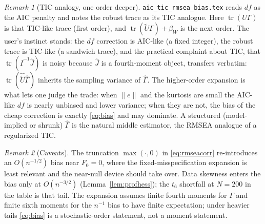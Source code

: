 \documentclass[11pt]{article}
\newcommand{\tr}{\operatorname{tr}}
\theoremstyle{plain}
\theoremstyle{remark}
\newtheorem*{remark}{Remark}
\begin{document}
\begin{remark}[TIC analogy, one order deeper]
\texttt{aic\_tic\_rmsea\_bias.tex} reads $df$ as the AIC penalty and notes the
robust trace as its TIC analogue. Here $\tr(U\Gamma)$ is that TIC-like trace
(first order), and $\tr(\tilde U\Gamma)+\beta_W$ is the next order. The user's
instinct stands: the $df$ correction is AIC-like (a fixed integer), the robust
trace is TIC-like (a sandwich trace), and the practical complaint about TIC, that
$\tr(\hat I^{-1}\hat J)$ is noisy because $\hat J$ is a fourth-moment object,
transfers verbatim: $\tr(\hat{\tilde U}\hat\Gamma)$ inherits the sampling
variance of $\hat\Gamma$. The higher-order expansion is what lets one judge the
trade: when $\|e\|$ and the kurtosis are small the AIC-like $df$ is nearly
unbiased and lower variance; when they are not, the bias of the cheap correction
is exactly \eqref{eq:bias} and may dominate. A structured (model-implied or
shrunk) $\hat\Gamma$ is the natural middle estimator, the RMSEA analogue of a
regularized TIC.
\end{remark}

\begin{remark}[Caveats]
The truncation $\max(\cdot,0)$ in \eqref{eq:rmseacorr} re-introduces an
$O(n^{-1/2})$ bias near $F_0=0$, where the fixed-misspecification expansion is
least relevant and the near-null device should take over. Data skewness enters
the bias only at $O(n^{-3/2})$ (Lemma~\ref{lem:profhess}); the $t_6$ shortfall at
$N=200$ in the table is that tail. The expansion assumes finite fourth moments
for $\Gamma$ and finite sixth moments for the $n^{-1}$ bias to have finite
expectation; under heavier tails \eqref{eq:bias} is a stochastic-order statement,
not a moment statement.
\end{remark}
\end{document}

